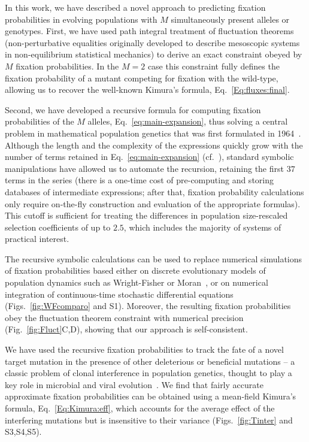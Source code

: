 \documentclass[9pt,twocolumn,twoside]{gsajnl}
\begin{document}
In this work, we have described a novel approach to predicting fixation probabilities in evolving populations with $M$ simultaneously present alleles or genotypes.
First, we have used path integral treatment
of fluctuation theorems (non-perturbative equalities originally developed to describe mesoscopic systems in non-equilibrium statistical mechanics)
to derive an exact constraint obeyed by $M$ fixation probabilities.
In the $M=2$ case this constraint %
fully defines the fixation probability of a mutant competing for fixation with the wild-type, allowing us to recover the well-known Kimura's formula, Eq.~\eqref{Eq:fluxes:final}.

Second, we have developed a recursive formula for computing
fixation probabilities of the $M$ alleles, Eq.~\eqref{eq:main-expansion}, thus solving a central problem in mathematical population genetics that was first formulated in 1964~\citep{Crow2009}.
Although the length and the complexity of the expressions quickly grow with the number of terms retained in Eq.~\eqref{eq:main-expansion} (cf.~), standard symbolic
manipulations have allowed us to automate the recursion, retaining the first $37$ terms in the series (there is a one-time cost of pre-computing and storing databases of intermediate expressions;
after that, fixation probability calculations only require on-the-fly construction and evaluation of the appropriate formulas).
This cutoff is sufficient for treating the differences in population size-rescaled selection coefficients of up to $2.5$, which includes the majority of systems of practical interest.

The recursive symbolic calculations can be used to replace numerical simulations of fixation probabilities based either on discrete evolutionary models of population dynamics such as Wright-Fisher or Moran~\citep{Ewens2004},
or on numerical integration of continuous-time stochastic differential equations (Figs.~\ref{fig:WFcomparo} and S1). Moreover, the resulting fixation probabilities obey the fluctuation theorem constraint with
numerical precision (Fig.~\ref{fig:Fluct}C,D), showing that our approach is self-consistent.

We have used the recursive fixation probabilities to track the fate of a novel target mutation in the presence of other deleterious or beneficial mutations -- a classic problem of clonal interference
in population genetics, thought to play a key role in microbial and viral evolution~\citep{Fisher1930,Muller1932,Gerrish1998}. We find that fairly accurate approximate fixation probabilities can be obtained
using a mean-field Kimura's formula, Eq.~\eqref{Eq:Kimura:eff}, which accounts for the average effect of the interfering mutations but is insensitive to their variance (Figs.~\ref{fig:Tinter} and S3,S4,S5).
\end{document}
